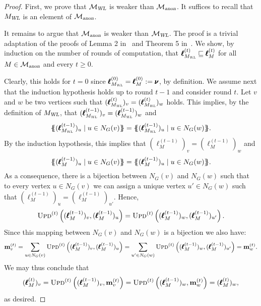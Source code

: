 \begin{proof}
First, we prove that $\mathcal{M}_{\textsl{WL}}$ is weaker than $\mathcal{M}_{\textsl{anon}}$. It suffices to recall that $M_{\textsl{WL}}$ is an element of $\mathcal{M}_{\textsl{anon}}$.

It remains to argue that $\mathcal{M}_{\textsl{anon}}$ is weaker than $\mathcal{M}_{\textsl{WL}}$. The proof is a trivial adaptation of the proofs of Lemma 2 in~\cite{xhlj19} and Theorem 5 in~\cite{grohewl}. We show, by induction on the number of rounds of computation, that  $\pmb{\ell}_{M_{\textsl{WL}}}^{(t)}\sqsubseteq \pmb{\ell}_M^{(t)}$ for all $M \in \mathcal{M}_{\textsl{anon}}$ and every $t\geq 0$.

Clearly, this holds for $t=0$ since $\pmb{\ell}_{M_{\textsl{WL}}}^{(0)}=\pmb{\ell}_M^{(0)}:=\pmb{\nu}$, by definition.
We assume next that the induction hypothesis holds up to round $t-1$ and consider round $t$.
Let $v$ and $w$ be two vertices such that 
$(\pmb{\ell}_{M_{\textsl{WL}}}^{(t)})_v=(\pmb{\ell}_{M_{\textsl{WL}}}^{(t)})_w$ holds.
This implies, by the definition of $M_{\textsl{WL}}$, that $(\pmb{\ell}_{M_{\textsl{WL}}}^{(t-1)})_v=(\pmb{\ell}_{M_{\textsl{WL}}}^{(t-1)})_w$  and
$$
\ldbl (\pmb{\ell}_{M_{\textsl{WL}}}^{(t-1)})_u\mid u\in N_G(v) \rdbl=
\ldbl (\pmb{\ell}_{M_{\textsl{WL}}}^{(t-1)})_u\mid u\in N_G(w) \rdbl.
$$
By the induction hypothesis, this implies that 
$(\pmb{\ell}_{M}^{(t-1)})_v=(\pmb{\ell}_{M}^{(t-1)})_w$  and
$$
\ldbl (\pmb{\ell}_{M}^{(t-1)})_u\mid u\in N_G(v) \rdbl=
\ldbl (\pmb{\ell}_{M}^{(t-1)})_u\mid u\in N_G(w) \rdbl.
$$
As a consequence, there is a bijection between $N_G(v)$ and $N_G(w)$ such that to every vertex $u\in N_G(v)$ we can assign a unique vertex $u'\in N_G(w)$ such that $(\pmb{\ell}_{M}^{(t-1)})_u=(\pmb{\ell}_{M}^{(t-1)})_{u'}$. Hence,
$$
\textsc{Upd}^{(t)}\left((\pmb{\ell}_{M}^{(t-1)})_v,(\pmb{\ell}_{M}^{(t-1)})_u\right)=
\textsc{Upd}^{(t)}\left((\pmb{\ell}_{M}^{(t-1)})_w,(\pmb{\ell}_{M}^{(t-1)})_{u'}\right).
$$
Since this mapping between $N_G(v)$ and $N_G(w)$ is a bijection we also have:
$$
\mathbf{m}^{(t)}_v=\sum_{u\in N_G(v)}\textsc{Upd}^{(t)}\left((\pmb{\ell}_{M}^{(t-1)})_v,(\pmb{\ell}_{M}^{(t-1)})_u\right)=\sum_{u'\in N_G(w)}\textsc{Upd}^{(t)}\left((\pmb{\ell}_{M}^{(t-1)})_w,(\pmb{\ell}_{M}^{(t-1)})_{u'}\right)=\mathbf{m}^{(t)}_w.
$$
We may thus conclude that $$(\pmb{\ell}_{M}^{(t)})_v=\textsc{Upd}^{(t)}\left((\pmb{\ell}_{M}^{(t-1)})_v,\mathbf{m}^{(t)}_v\right)=\textsc{Upd}^{(t)}\left((\pmb{\ell}_{M}^{(t-1)})_w,\mathbf{m}^{(t)}_w\right)=(\pmb{\ell}_{M}^{(t)})_w,
$$
as desired.
%

\end{proof}
